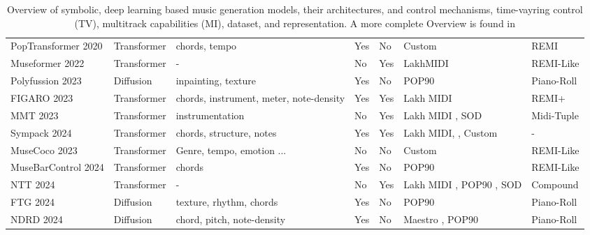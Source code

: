 \begin{table}[H]
\begin{tabular}{|p{2.5cm}|p{1.8cm}|p{3cm}|p{1cm}|p{1cm}|p{3cm}|p{2.5cm}|}
        PopTransformer 2020 \cite{Huang_Yang_remi_pop_transformer_2020} & Transformer & chords, tempo & Yes & No & Custom & REMI\\
        Museformer 2022 \cite{Yu_Lu_Wang_Hu_Tan_Ye_Zhang_museformer_2022} & Transformer & - & No & Yes & LakhMIDI \cite{Raffel_2016} & REMI-Like\\
        Polyfussion 2023 \cite{Min_Jiang_Xia_Zhao_polyffusion_2023} & Diffusion & inpainting, texture & Yes & No & POP90 \cite{Wang_Chen_pop90_dataset} & Piano-Roll\\
        FIGARO 2023 \cite{Rütte_figaro_2023} & Transformer & chords, instrument, meter, note-density & Yes & Yes & Lakh MIDI \cite{Raffel_2016} & REMI+ \\
        MMT 2023 \cite{Dong_Chen_MMT_Kirkpatrick_2023} & Transformer & instrumentation & No & Yes & Lakh MIDI \cite{Raffel_2016}, SOD \cite{Crestel_OrchestralDataset} & Midi-Tuple \\
        Sympack 2024 \cite{Chen_Smith_Spijkervet_Wang_Zou_Li_Kong_Du_2024} & Transformer & chords, structure, notes & Yes & Yes & Lakh MIDI\cite{Raffel_2016}, \cite{Bertin-Mahieux_Ellis_Whitman_Lamere_2011}, Custom & -\\
        MuseCoco 2023 \cite{Lu_Xu_Kang_Yu_Xing_Tan_Bian_MuseCoco_2023} & Transformer & Genre, tempo, emotion ...  & No & No & Custom & REMI-Like\\
        MuseBarControl 2024 \cite{Shu_Xu_Musebarcontrol_2024} & Transformer & chords & Yes & No & POP90 \cite{Wang_Chen_pop90_dataset} & REMI-Like\\
        NTT 2024 \cite{Ryu_Dong_nested_2024} & Transformer & - & No  & Yes & Lakh MIDI \cite{Raffel_2016}, POP90 \cite{Wang_Chen_pop90_dataset}, SOD \cite{Crestel_OrchestralDataset} & Compound\\
        FTG 2024 \cite{Zhu_Liu_Jiang_Zheng_texture_2024} & Diffusion & texture, rhythm, chords & Yes & No & POP90 \cite{Wang_Chen_pop90_dataset} & Piano-Roll \\
        NDRD 2024 \cite{Huang_rule_diffusion_2024} & Diffusion & chord, pitch, note-density & Yes & No & Maestro \cite{hawthorne2018maestro}, POP90 \cite{Wang_Chen_pop90_dataset} & Piano-Roll \\
        \hline
    \end{tabular}
    \caption{Overview of symbolic, deep learning based music generation models, their architectures, and control mechanisms, time-vayring control (TV), multitrack capabilities (MI), dataset, and representation. A more complete Overview
    is found in \cite{Ji_Yang_Luo_survey_symbolic_2024}}
    \label{table:bigtable}
\end{table}

